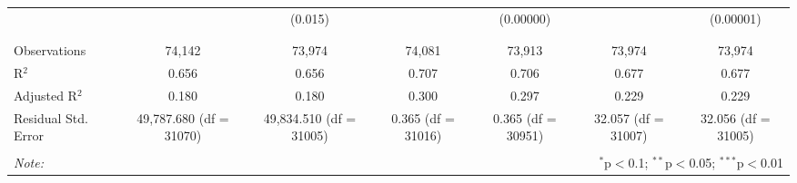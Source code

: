 \begin{table}[H]
{\begin{tabular}{@{\extracolsep{5pt}}lcccccc}
   &  & (0.015) &  & (0.00000) &  & (0.00001) \\  

   & & & & & & \\  

 \hline \\[-1.8ex]  

 Observations & 74,142 & 73,974 & 74,081 & 73,913 & 73,974 & 73,974 \\  

 R$^{2}$ & 0.656 & 0.656 & 0.707 & 0.706 & 0.677 & 0.677 \\  

 Adjusted R$^{2}$ & 0.180 & 0.180 & 0.300 & 0.297 & 0.229 & 0.229 \\  

 Residual Std. Error & 49,787.680 (df = 31070) & 49,834.510 (df = 31005) & 0.365 (df = 31016) & 0.365 (df = 30951) & 32.057 (df = 31007) & 32.056 (df = 31005) \\  

 \hline  

 \hline \\[-1.8ex]  

 \textit{Note:}  & \multicolumn{6}{r}{$^{*}$p$<$0.1; $^{**}$p$<$0.05; $^{***}$p$<$0.01} \\  

 \end{tabular}}  

 \end{table}  

